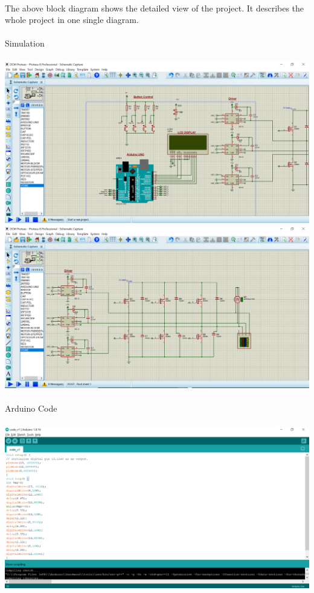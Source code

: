 \\
The above block diagram shows the detailed view of the project. It describes the whole project in one single diagram.
\\ \\
{\large Simulation}
\\ \\
{\includegraphics[height=0.3\textheight]{Figures/pro1.png}}
\\
{\includegraphics[height=0.3\textheight]{Figures/pro2.png}}
\\ \\
{\large Arduino Code} 
\\ \\
{\includegraphics[height=0.3\textheight]{Figures/pro3.png}}





